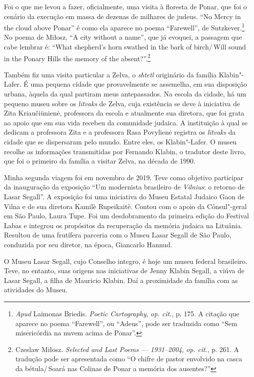 Foi o que me levou a fazer, oficialmente, uma visita à floresta de
Ponar, que foi o cenário da execução em massa de dezenas de milhares de
judeus. ``No Mercy in the cloud above Ponar'' é como ela aparece no
poema ``Farewell'', de Sutzkever.\footnote{\textit{Apud} Laimonas Briedis.
  \textit{Poetic Cartography}, \textit{op. cit.}, p. 175. A citação que aparece no poema ``Farewell'', ou ``Adeus'', pode ser traduzida como ``Sem misericórdia na nuvem acima de Ponar''.} No poema de
Miłosz, ``A city without a name'', que já evoquei, a passagem que cabe
lembrar é: ``What shepherd's horn swathed in the bark of birch/\,Will
sound in the Ponary Hills the memory of the absent?''.\footnote{Czeslaw
  Miłosz. \textit{Selected and Last Poems --- 1931--2004}, \textit{op.
  cit.}, p. 261. A tradução pode ser apresentada como ``O chifre de pastor envolvido na casca da bétula/\,Soará nas Colinas de Ponar a memória dos ausentes?''}

Também fiz uma visita particular a Zelva, o \textit{shtetl} originário da
família Klabin"-Lafer. É uma pequena cidade que provavelmente se
assemelha, em sua disposição urbana, àquela da qual partiram meus
antepassados. Na escola da cidade, há um pequeno museu sobre os
\textit{litvaks} de Zelva, cuja existência se deve à iniciativa de Zita
Kriaučiūnienė, professora da escola e atualmente sua diretora, que foi
grata ao apoio que em sua vida recebeu da comunidade judaica. A
instituição à qual se dedicam a professora Zita e a professora Rasa
Povylienė registra os \textit{litvaks} da cidade que se dispersaram pelo
mundo. Entre eles, os Klabin"-Lafer. O museu recolhe as informações
transmitidas por Fernando Klabin, o tradutor deste livro, que foi o
primeiro da família a visitar Zelva, na década de 1990.

Minha segunda viagem foi em novembro de 2019. Teve como objetivo
participar da inauguração da exposição ``Um modernista brasileiro de
\textit{Vilnius}: o retorno de Lasar Segall''. A exposição foi uma iniciativa do
Museu Estatal Judaico Gaon de Vilna e de sua diretora Kamilè Rupeikaitè.
Contou com o apoio da Cônsul"-geral em São Paulo, Laura Tupe. Foi um
desdobramento da primeira edição do Festival Labas e integrou os
propósitos da recuperação da memória judaica na Lituânia. Resultou de
uma frutífera parceria com o Museu Lasar Segall de São Paulo, conduzida
por seu diretor, na época, Giancarlo Hannud.

O Museu Lasar Segall, cujo Conselho integro, é hoje um museu federal
brasileiro. Teve, no entanto, suas origens nas iniciativas de Jenny
Klabin Segall, a viúva de Lasar Segall, a filha de Mauricio Klabin. Daí
a proximidade da família com as atividades do Museu.

